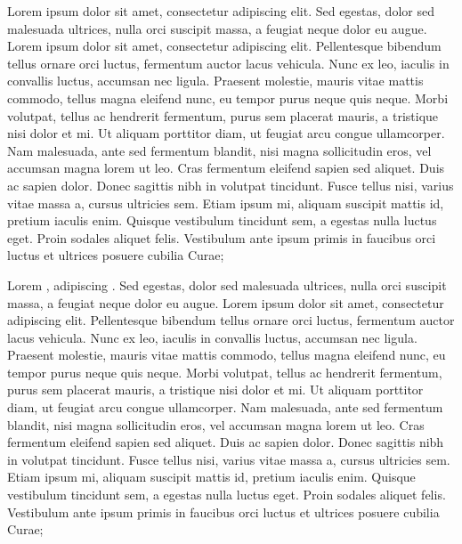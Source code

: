 \documentclass[a4paper]{article}
\begin{document}
\begin{pairs}
\begin{Rightside}
        \pend
       
        
        \pstart
Lorem ipsum dolor sit amet, consectetur adipiscing elit. Sed egestas, dolor sed malesuada ultrices, nulla orci suscipit massa, a feugiat neque dolor eu augue. Lorem ipsum dolor sit amet, consectetur adipiscing elit. Pellentesque bibendum tellus ornare orci luctus, fermentum auctor lacus vehicula. Nunc ex leo, iaculis in convallis luctus, accumsan nec ligula. Praesent molestie, mauris vitae mattis commodo, tellus magna eleifend nunc, eu tempor purus neque quis neque. Morbi volutpat, tellus ac hendrerit fermentum, purus sem placerat mauris, a tristique nisi dolor et mi. Ut aliquam porttitor diam, ut feugiat arcu congue ullamcorper. Nam malesuada, ante sed fermentum blandit, nisi magna sollicitudin eros, vel accumsan magna lorem ut leo. Cras fermentum eleifend sapien sed aliquet. Duis ac sapien dolor. Donec sagittis nibh in volutpat tincidunt. Fusce tellus nisi, varius vitae massa a, cursus ultricies sem. Etiam ipsum mi, aliquam suscipit mattis id, pretium iaculis enim. Quisque vestibulum tincidunt sem, a egestas nulla luctus eget. Proin sodales aliquet felis. Vestibulum ante ipsum primis in faucibus orci luctus et ultrices posuere cubilia Curae;
 
        \pend
        
\pausenumbering
\end{Rightside}
\end{pairs}
\Columns

    \resumenumbering
    

 


            \pstart
Lorem    ,  adipiscing . Sed egestas, dolor sed malesuada ultrices, nulla orci suscipit massa, a feugiat neque dolor eu augue. Lorem ipsum dolor sit amet, consectetur adipiscing elit. Pellentesque bibendum tellus ornare orci luctus, fermentum auctor lacus vehicula. Nunc ex leo, iaculis in convallis luctus, accumsan nec ligula. Praesent molestie, mauris vitae mattis commodo, tellus magna eleifend nunc, eu tempor purus neque quis neque. Morbi volutpat, tellus ac hendrerit fermentum, purus sem placerat mauris, a tristique nisi dolor et mi. Ut aliquam porttitor diam, ut feugiat arcu congue ullamcorper. Nam malesuada, ante sed fermentum blandit, nisi magna sollicitudin eros, vel accumsan magna lorem ut leo. Cras fermentum eleifend sapien sed aliquet. Duis ac sapien dolor. Donec sagittis nibh in volutpat tincidunt. Fusce tellus nisi, varius vitae massa a, cursus ultricies sem. Etiam ipsum mi, aliquam suscipit mattis id, pretium iaculis enim. Quisque vestibulum tincidunt sem, a egestas nulla luctus eget. Proin sodales aliquet felis. Vestibulum ante ipsum primis in faucibus orci luctus et ultrices posuere cubilia Curae;
\end{document}
